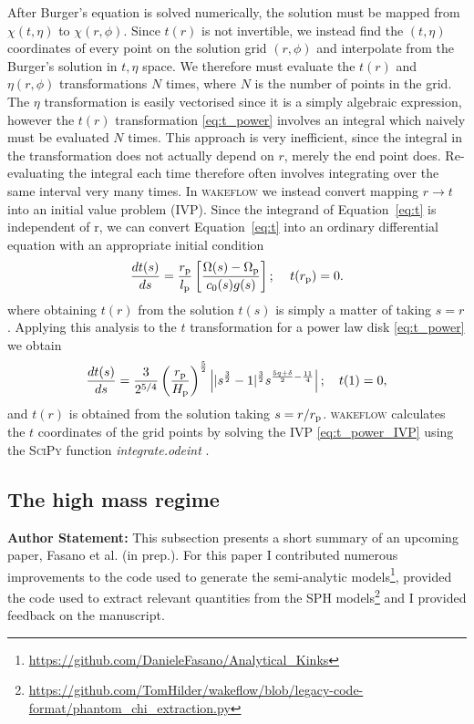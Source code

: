 After Burger's equation is solved numerically, the solution must be mapped from $\chi(t,\eta)$ to $\chi(r,\phi)$.
Since $t(r)$ is not invertible, we instead find the $(t,\eta)$ coordinates of every point on the solution grid $(r,\phi)$ and interpolate from the Burger's solution in $t,\eta$ space.
We therefore must evaluate the $t(r)$ and $\eta(r,\phi)$ transformations $N$ times, where $N$ is the number of points in the grid.
The $\eta$ transformation is easily vectorised since it is a simply algebraic expression, however the $t(r)$ transformation \eqref{eq:t_power} involves an integral which naively must be evaluated $N$ times.
This approach is very inefficient, since the integral in the transformation does not actually depend on $r$, merely the end point does.
Re-evaluating the integral each time therefore often involves integrating over the same interval very many times.
In \textsc{wakeflow} we instead convert mapping $r\rightarrow t$ into an initial value problem (IVP).
Since the integrand of Equation~\eqref{eq:t} is independent of r, we can convert Equation~\eqref{eq:t} into an ordinary differential equation with an appropriate initial condition
\begin{align}
    \frac{dt(s)}{ds} = \frac{r_{\rm p}}{l_{\rm p}} \left[ \frac{\Omega(s) - \Omega_{\rm p}}{c_0(s) g(s)} \right]; \quad \, t(r_{\rm p}) = 0.
\end{align}
where obtaining $t(r)$ from the solution $t(s)$ is simply a matter of taking $s=r$.
Applying this analysis to the $t$ transformation for a power law disk \eqref{eq:t_power} we obtain 
\begin{align}
    \frac{dt(s)}{ds} = \frac{3}{2^{5/4}} \left( \frac{r_{\rm p}}{H_{\rm p}} \right)^{\frac{5}{2}} \left| |s^\frac{3}{2} - 1|^\frac{3}{2} s^{\frac{5q+\delta}{2}-\frac{11}{4}} \right|; \quad t(1)=0, \label{eq:t_power_IVP}
\end{align}
and $t(r)$ is obtained from the solution taking $s=r/r_{\rm p}$.
\textsc{wakeflow} calculates the $t$ coordinates of the grid points by solving the IVP \eqref{eq:t_power_IVP} using the \textsc{SciPy} function \textit{integrate.odeint} \citep{virtanen2020}.

\subsection{The high mass regime} \label{sec:high_mass}

\textbf{Author Statement:} This subsection presents a short summary of an upcoming paper, Fasano et al. (in prep.). 
For this paper I contributed numerous improvements to the code used to generate the semi-analytic models\footnote{\url{https://github.com/DanieleFasano/Analytical_Kinks}}, provided the code used to extract relevant quantities from the SPH models\footnote{\url{https://github.com/TomHilder/wakeflow/blob/legacy-code-format/phantom_chi_extraction.py}} and I provided feedback on the manuscript.

